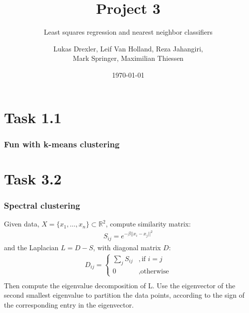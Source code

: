 \documentclass{beamer}
\title[Project 3]{Project 3}
\subtitle{Least squares regression and nearest neighbor classifiers}
\author{Lukas Drexler, Leif Van Holland, Reza Jahangiri,\\Mark Springer, Maximilian Thiessen}
\institute[Universität Bonn]{Rheinische Friedrich-Wilhelms-Universität}
\date{\today}
\begin{document}
	
\begin{frame}%
	\titlepage
\end{frame}



\section{Task 1.1}

\begin{frame}
\frametitle{Fun with k-means clustering}

\end{frame}


\section{Task 3.2}
\begin{frame}
	\frametitle{Spectral clustering}
	Given data, $X = \{x_1,\ldots,x_n\} \subset \mathbb{R}^2$, compute similarity matrix:
	\begin{align*}
		S_{ij} = e^{-\beta ||x_i-x_j||^2}
	\end{align*}
	and the Laplacian $L = D-S$, with diagonal matrix $D$:
	\begin{align*}
	D_{ij} = \begin{cases}
	\sum_j S_{ij} & ,\text{if } i=j\\
	0 &, \text{otherwise}
	\end{cases}\\
	\end{align*}
	Then compute the eigenvalue decomposition of L. Use the eigenvector of the second smallest eigenvalue to partition the data points, according to the sign of the corresponding entry in the eigenvector.
\end{frame}
\end{document}
